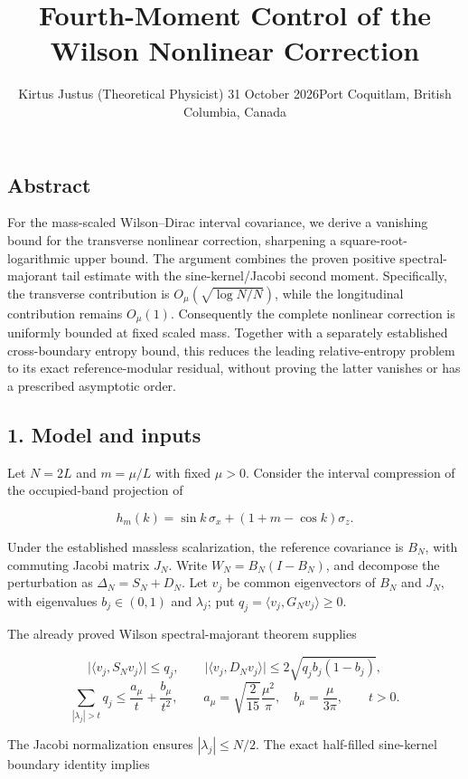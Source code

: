 \documentclass[
  10pt,
  a4paper,
]{article}
\title{Fourth-Moment Control of the Wilson Nonlinear Correction}
\author{Kirtus Justus (Theoretical Physicist) \textbullet{} 31 October 2026\tabularnewline Port Coquitlam, British Columbia, Canada}
\date{}
\begin{document}
\maketitle

\subsection{Abstract}\label{abstract}

For the mass-scaled Wilson--Dirac interval covariance, we derive a vanishing bound for the transverse nonlinear correction, sharpening a square-root-logarithmic upper bound. The argument combines the proven positive spectral-majorant tail estimate with the sine-kernel/Jacobi second moment. Specifically, the transverse contribution is \(O_\mu(\sqrt{\log N/N})\), while the longitudinal contribution remains \(O_\mu(1)\). Consequently the complete nonlinear correction is uniformly bounded at fixed scaled mass. Together with a separately established cross-boundary entropy bound, this reduces the leading relative-entropy problem to its exact reference-modular residual, without proving the latter vanishes or has a prescribed asymptotic order.

\subsection{1. Model and inputs}\label{model-and-inputs}

Let \(N=2L\) and \(m=\mu/L\) with fixed \(\mu>0\). Consider the interval compression of the occupied-band projection of

\[
h_m(k)=\sin k\,\sigma_x+(1+m-\cos k)\sigma_z.
\]

Under the established massless scalarization, the reference covariance is \(B_N\), with commuting Jacobi matrix \(J_N\). Write \(W_N=B_N(I-B_N)\), and decompose the perturbation as \(\Delta_N=S_N+D_N\). Let \(v_j\) be common eigenvectors of \(B_N\) and \(J_N\), with eigenvalues \(b_j\in(0,1)\) and \(\lambda_j\); put \(q_j=\langle v_j,G_Nv_j\rangle\ge0\).

The already proved Wilson spectral-majorant theorem supplies

\[
\lvert\langle v_j,S_Nv_j\rangle\rvert\le q_j,\qquad
\lvert\langle v_j,D_Nv_j\rangle\rvert\le2\sqrt{q_jb_j(1-b_j)},
\] \[
\sum_{|\lambda_j|>t}q_j\le\frac{a_\mu}{t}+\frac{b_\mu}{t^2},\qquad
a_\mu=\sqrt{\frac2{15}}\frac{\mu^2}{\pi},\quad b_\mu=\frac{\mu}{3\pi},\qquad t>0.
\]

The Jacobi normalization ensures \(|\lambda_j|\le N/2\). The exact half-filled sine-kernel boundary identity implies
\end{document}
